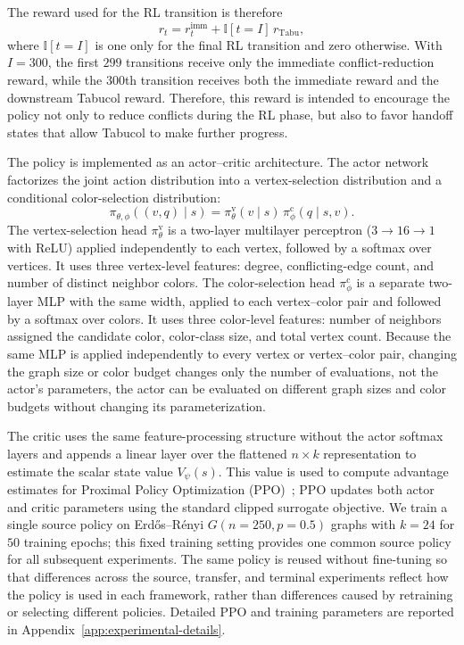 The reward used for the RL transition is therefore
\begin{equation}
r_t
=
r_t^{\mathrm{imm}}
+
\mathbb{I}[t=I]\,r_{\mathrm{Tabu}},
\label{eq:total-reward}
\end{equation}
where $\mathbb{I}[t=I]$ is one only for the final RL transition and zero
otherwise. With $I=300$, the first $299$ transitions receive only the
immediate conflict-reduction reward, while the $300$th transition receives
both the immediate reward and the downstream Tabucol reward. Therefore, this  reward is intended to encourage the policy not only to reduce conflicts during the RL phase, but also to favor handoff states that allow Tabucol to make further progress.


The policy is implemented as an actor--critic architecture. The actor network factorizes the joint action distribution into a vertex-selection distribution and a conditional color-selection distribution:
\begin{equation}
  \pi_{\theta,\phi}((v,q)\mid s)
  =
  \pi^{\mathrm{v}}_\theta(v\mid s)\,
  \pi^{\mathrm{c}}_\phi(q\mid s,v).
  \label{eq:rl_policy_factorisation}
\end{equation}
The vertex-selection head $\pi^{\mathrm{v}}_\theta$ is a two-layer multilayer perceptron ($3\!\to\!16\!\to\!1$ with ReLU) applied independently to each vertex, followed by a softmax over vertices. It uses three vertex-level features: degree, conflicting-edge count, and number of distinct neighbor colors. The color-selection head $\pi^{\mathrm{c}}_\phi$ is a separate two-layer MLP with the same width, applied to each vertex--color pair and followed by a softmax over colors. It uses three color-level features: number of neighbors assigned the candidate color, color-class size, and total vertex count. Because the same MLP is applied independently to every vertex or vertex--color pair, changing the graph size or color budget changes only the number of evaluations, not the actor's parameters, the actor can be evaluated on different graph sizes and color budgets without changing its parameterization.

The critic uses the same feature-processing structure without the actor softmax layers and appends a linear layer over the flattened $n\times k$ representation to estimate the scalar state value $V_\psi(s)$. This value is used to compute advantage estimates for Proximal Policy Optimization (PPO)~\cite{schulman2017ppo}; PPO updates both actor and critic parameters using the standard clipped surrogate objective. We train a single source policy on Erd\H{o}s--R\'enyi
$G(n{=}250,p{=}0.5)$ graphs with $k{=}24$ for $50$ training epochs; this fixed training setting provides
one common source policy for all subsequent experiments. The same policy
is reused without fine-tuning so that differences across the source, transfer,
and terminal experiments reflect how the policy is used in each framework,
rather than differences caused by retraining or selecting different policies. Detailed PPO and training parameters are reported in Appendix~\ref{app:experimental-details}.

